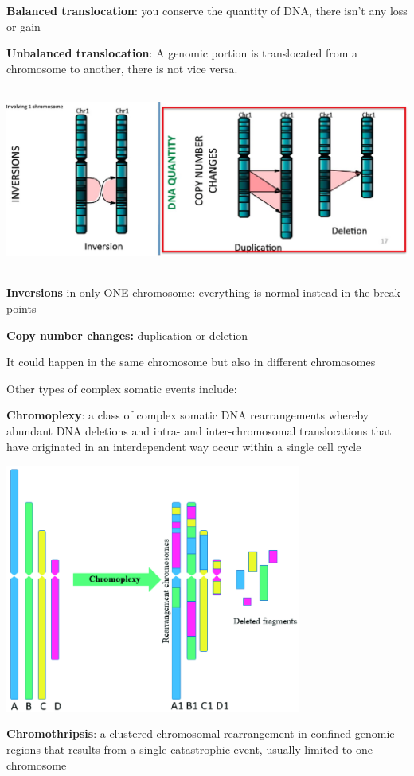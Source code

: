 \textbf{Balanced translocation}: you conserve the quantity of DNA, there isn't
any loss or gain

\textbf{Unbalanced translocation}: A genomic portion is translocated from a
chromosome to another, there is not vice versa.

\includegraphics[width=6.22722in,height=2.39062in]{image7.jpeg}

\textbf{Inversions} in only ONE chromosome: everything is normal instead in the
break points

\textbf{Copy number changes:} duplication or deletion

It could happen in the same chromosome but also in different chromosomes

Other types of complex somatic events include:

\textbf{Chromoplexy}: a class of complex somatic DNA rearrangements whereby
abundant DNA deletions and intra- and inter-chromosomal translocations that have
originated in an interdependent way occur within a single cell cycle

\includegraphics[width=3.81944in,height=3.21433in]{image8.png}

\textbf{Chromothripsis}: a clustered chromosomal rearrangement in confined
genomic regions that results from a single catastrophic event, usually limited
to one chromosome

